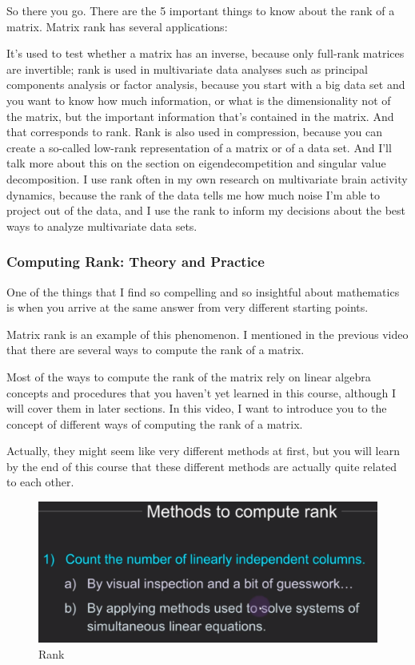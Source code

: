 \documentclass[fleqn,10pt]{olplainarticle}
\theoremstyle{definition}
\theoremstyle{remark}
\begin{document}
So there you go. There are the 5 important things to know about the rank of a matrix. Matrix rank has several applications:

It's used to test whether a matrix has an inverse, because only full-rank matrices are invertible; rank is used in multivariate data analyses such as principal components analysis or factor analysis, because you start with a big data set and you want to know how much information, or what is the dimensionality
not of the matrix, but the important information that's contained in the matrix. And that corresponds to rank. Rank is also used in compression, because you can create a so-called low-rank representation of a matrix or of a data set. And I'll talk more about this on the section on eigendecompetition and singular value decomposition. I use rank often in my own research on multivariate brain activity dynamics, because the rank of the data tells me how much noise I'm able to project out of the data, and I use the rank to inform my decisions about the best ways to analyze multivariate data sets.

\pagebreak

\subsubsection*{Computing Rank: Theory and Practice}

One of the things that I find so compelling and so insightful about mathematics is when you arrive at the same answer from very different starting points.

Matrix rank is an example of this phenomenon. I mentioned in the previous video that there are several ways to compute the rank of a matrix.

Most of the ways to compute the rank of the matrix rely on linear algebra concepts and procedures that you haven't yet learned in this course, although I will cover them in later sections. In this video, I want to introduce you to the concept of different ways of computing the rank of a matrix.

Actually, they might seem like very different methods at first, but you will learn by the end of this course that these different methods are actually quite related to each other.

\begin{figure}[ht]
	\centering
	\includegraphics[width=0.5\linewidth]{images/rank-13.png}
	\caption{Rank}
	\label{fig:rank_13}
\end{figure}
\end{document}

